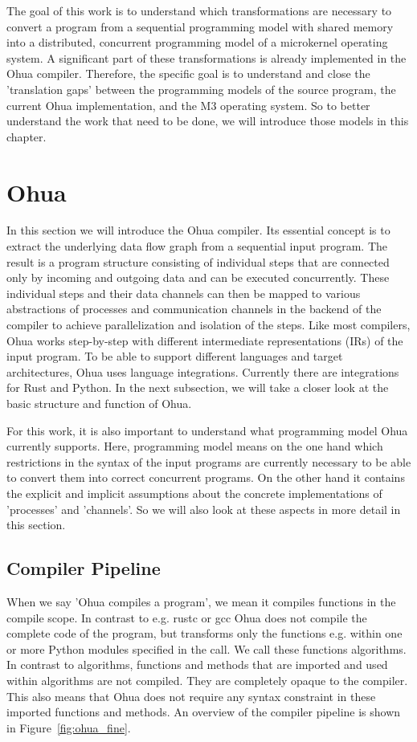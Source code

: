 The goal of this work is to understand which transformations are necessary to convert a program from a sequential programming model with shared memory into a distributed, concurrent programming model of a microkernel operating system. A significant part of these transformations is already implemented in the Ohua compiler. Therefore, the specific goal is to understand and close the 'translation gaps' between the programming models of the source program, the current Ohua implementation, and the M3 operating system. So to better understand the work that need to be done, we will introduce those models in this chapter.

\section{Ohua}
\label{sec:back_ohua}
In this section we will introduce the Ohua compiler\cite{ertel2015ohua}. Its essential concept is to extract the underlying data flow graph from a sequential input program. The result is a program structure consisting of individual steps that are connected only by incoming and outgoing data and can be executed concurrently. These individual steps and their data channels can then be mapped to various abstractions of processes and communication channels in the backend of the compiler to achieve parallelization and isolation of the steps. Like most compilers, Ohua works step-by-step with different intermediate representations (IRs) of the input program. To be able to support different languages and target architectures, Ohua uses language integrations. Currently there are integrations for Rust and Python. In the next subsection, we will take a closer look at the basic structure and function of Ohua. 

For this work, it is also important to understand what programming model Ohua currently supports. Here, programming model means on the one hand which restrictions in the syntax of the input programs are currently necessary to be able to convert them into correct concurrent programs. On the other hand it contains the explicit and implicit assumptions about the concrete implementations of 'processes' and 'channels'. So we will also look at these aspects in more detail in this section.

\subsection{Compiler Pipeline}
\label{subec:OhuaPipeline}
When we say 'Ohua compiles a program', we mean it compiles functions in the compile scope. In contrast to e.g. rustc or gcc Ohua does not compile the complete code of the program, but transforms only the functions e.g. within one or more Python modules specified in the call. We call these functions algorithms. In contrast to algorithms, functions and methods that are imported and used within algorithms are not compiled. They are completely opaque to the compiler. This also means that Ohua does not require any syntax constraint in these imported functions and methods. An overview of the compiler pipeline is shown in Figure~\ref{fig:ohua_fine}.  

